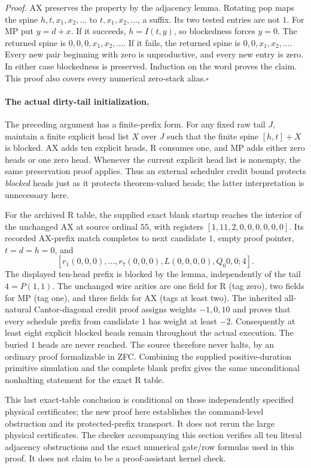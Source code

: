 \emph{Proof.} AX preserves the property by the adjacency lemma.
Rotating pop maps the spine $h,t,x_1,x_2,\ldots$ to
$t,x_1,x_2,\ldots$, a suffix. Its two tested entries are not $1$.
For MP put $y=d+x$. If it succeeds, $h=I(t,y)$, so blockedness forces
$y=0$. The returned spine is $0,0,0,x_1,x_2,\ldots$. If it fails,
the returned spine is $0,0,x_1,x_2,\ldots$. Every new pair beginning
with zero is unproductive, and every new entry is zero. In either
case blockedness is preserved. Induction on the word proves the claim.
This proof also covers every numerical zero-stack alias.\hfill$\square$

\paragraph{The actual dirty-tail initialization.}
The preceding argument has a finite-prefix form. For any fixed raw tail
$J$, maintain a finite explicit head list $X$ over $J$ such that the
finite spine $[h,t]+X$ is blocked. AX adds ten explicit heads, R consumes
one, and MP adds either zero heads or one zero head. Whenever the
current explicit head list is nonempty, the same preservation proof
applies. Thus an external scheduler credit bound protects \emph{blocked}
heads just as it protects theorem-valued heads; the latter interpretation
is unnecessary here.

For the archived R table, the supplied exact blank startup reaches the
interior of the unchanged AX at source ordinal $55$, with registers
$[1,11,2,0,0,0,0,0,0]$. Its recorded AX-prefix match completes to next
candidate $1$, empty proof pointer, $t=d=h=0$, and
\[
 [r_1(0,0,0),\ldots,r_7(0,0,0),L(0,0,0,0),Q_0 0,0;4].
\]
The displayed ten-head prefix is blocked by the lemma, independently
of the tail $4=P(1,1)$. The unchanged wire arities are one field for
R (tag zero), two fields for MP (tag one), and three fields for AX
(tags at least two). The inherited all-natural Cantor-diagonal credit
proof assigns weights $-1,0,10$ and proves that every schedule prefix
from candidate $1$ has weight at least $-2$. Consequently at least
eight explicit blocked heads remain throughout the actual execution.
The buried $1$ heads are never reached. The source therefore never
halts, by an ordinary proof formalizable in ZFC. Combining the supplied
positive-duration primitive simulation and the complete blank prefix
gives the same unconditional nonhalting statement for the exact R table.

This last exact-table conclusion is conditional on those independently
specified physical certificates; the new proof here establishes the
command-level obstruction and its protected-prefix transport. It does
not rerun the large physical certificates. The checker accompanying this
section verifies all ten literal adjacency obstructions and the exact
numerical gate/row formulas used in this proof. It does not claim to
be a proof-assistant kernel check.

